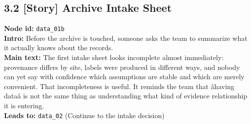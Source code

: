 \documentclass[11pt]{article}
\begin{document}
\subsection*{3.2 [Story] Archive Intake Sheet}
\textbf{Node id:} \texttt{data\_01b}\\
\textbf{Intro:} Before the archive is touched, someone asks the team to summarize what it actually knows about the records.\\
\textbf{Main text:} The first intake sheet looks incomplete almost immediately: provenance differs by site, labels were produced in different ways, and nobody can yet say with confidence which assumptions are stable and which are merely convenient. That incompleteness is useful. It reminds the team that âhaving dataâ is not the same thing as understanding what kind of evidence relationship it is entering.\\
\textbf{Leads to:} \texttt{data\_02} (Continue to the intake decision)\\
\end{document}

